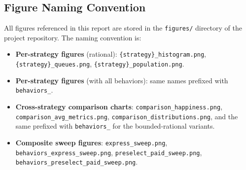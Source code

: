 \documentclass[11pt]{article}
\begin{document}
\subsection*{Figure Naming Convention}

All figures referenced in this report are stored in the \texttt{figures/} directory of the project repository. The naming convention is:

\begin{itemize}[leftmargin=*, itemsep=4pt]
    \item \textbf{Per-strategy figures} (rational): \texttt{\{strategy\}\_histogram.png}, \texttt{\{strategy\}\_queues.png}, \texttt{\{strategy\}\_population.png}.
    \item \textbf{Per-strategy figures} (with all behaviors): same names prefixed with \texttt{behaviors\_}.
    \item \textbf{Cross-strategy comparison charts}: \texttt{comparison\_happiness.png}, \texttt{comparison\_avg\_metrics.png}, \texttt{comparison\_distributions.png}, and the same prefixed with \texttt{behaviors\_} for the bounded-rational variants.
    \item \textbf{Composite sweep figures}: \texttt{express\_sweep.png}, \texttt{behaviors\_express\_sweep.png}, \texttt{preselect\_paid\_sweep.png}, \texttt{behaviors\_preselect\_paid\_sweep.png}.
\end{itemize}
\end{document}

